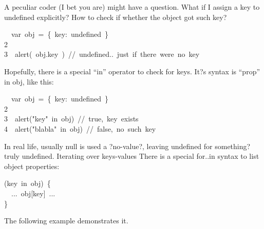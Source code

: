 \documentclass{article}
\begin{document}
\noindent{}A peculiar coder (I bet you are) might have a question. What if I assign a key to undefined explicitly? How to check if whether the object got such key?%
\begin{mdpre}%
~~{var}~obj~=~\{~key:~undefined~\}\\
{2}\\
{3}~~alert(~obj.key~)~{//~undefined..~just~if~there~were~no~key}%
\end{mdpre}\noindent{}Hopefully, there is a special \textquotedblleft{}in\textquotedblright{} operator to check for keys. It?s syntax is \textquotedblleft{}prop\textquotedblright{} in obj, like this: 
\begin{mdpre}%
~~{var}~obj~=~\{~key:~undefined~\}\\
{2}\\
{3}~~alert({"}{key}{"}~{in}~obj)~{//~true,~key~exists}\\
{4}~~alert({"}{blabla}{"}~{in}~obj)~{//~false,~no~such~key}%
\end{mdpre}\noindent{}In real life, usually null is used a ?no-value?, leaving undefined for something? truly undefined.
Iterating over keys-values
There is a special for..in syntax to list object properties: 
\begin{mdpre}%
(key~{in}~obj)~\{\\
~~...~obj{}[key]~...\\
\}%
\end{mdpre}\noindent{}The following example demonstrates it. 
\end{document}
